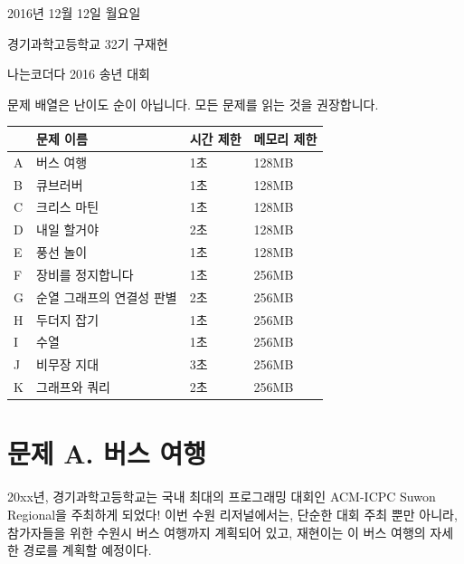 \documentclass{article}
\begin{document}
\begin{titlepage}
	\centering
	{2016년 12월 12일 월요일\par}
	{경기과학고등학교 32기 구재현\par}
	\vspace{2cm}
	{\huge 나는코더다 2016 송년 대회 \par}
	\vspace{4cm}
	{\Large 문제 배열은 난이도 순이 아닙니다. 모든 문제를 읽는 것을 권장합니다.\par}
	\vspace{4cm}
	\label{my-label}
	\begin{tabular}{|l|l|l|l|}
		\hline
		& 문제 이름                  & 시간 제한 & 메모리 제한 \\ \hline
		A & 버스 여행               & 1초    & 128MB  \\ \hline
		B & 큐브러버                   & 1초    & 128MB  \\ \hline
		C & 크리스 마틴                 & 1초    & 128MB  \\ \hline
		D & 내일 할거야                 & 2초    & 128MB  \\ \hline
		E & 풍선 놀이                  & 1초    & 128MB  \\ \hline
		F & 장비를 정지합니다               & 1초    & 256MB  \\ \hline
		G & 순열 그래프의 연결성 판별         & 2초    & 256MB  \\ \hline
		H & 두더지 잡기                & 1초    & 256MB  \\ \hline
		I & 수열                     & 1초    & 256MB  \\ \hline
		J & 비무장 지대 & 3초    & 256MB  \\ \hline
		K & 그래프와 쿼리                  & 2초    & 256MB  \\ \hline
	\end{tabular}

\end{titlepage}




\section{문제 A. 버스 여행}
20xx년, 경기과학고등학교는 국내 최대의 프로그래밍 대회인 ACM-ICPC Suwon Regional을 주최하게 되었다! 이번 수원 리저널에서는, 단순한 대회 주최 뿐만 아니라, 참가자들을 위한 수원시 버스 여행까지 계획되어 있고, 재현이는 이 버스 여행의 자세한 경로를 계획할 예정이다. \newline
\end{document}
